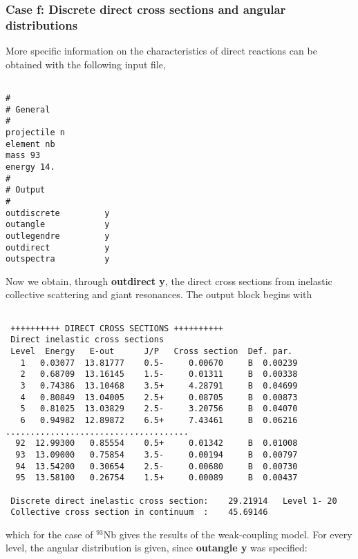\begin{samplecase}
\subsubsection{Case f: Discrete direct cross sections and angular 
distributions}
More specific information on the characteristics of direct reactions can be 
obtained with the following input file,

{\small \begin{verbatim}

#
# General
#
projectile n
element nb
mass 93
energy 14.
#
# Output
#
outdiscrete         y
outangle            y     
outlegendre         y     
outdirect           y
outspectra          y
\end{verbatim} } \renewcommand{\baselinestretch}{1.07}\small\normalsize
\noindent
Now we obtain, through {\bf outdirect y}, the direct cross sections from 
inelastic collective scattering and giant resonances. The output block
begins with

{\small \begin{verbatim}

 ++++++++++ DIRECT CROSS SECTIONS ++++++++++                                    
 Direct inelastic cross sections                                                
 Level  Energy   E-out      J/P   Cross section  Def. par.                      
   1   0.03077  13.81777    0.5-     0.00670     B  0.00239                     
   2   0.68709  13.16145    1.5-     0.01311     B  0.00338
   3   0.74386  13.10468    3.5+     4.28791     B  0.04699                     
   4   0.80849  13.04005    2.5+     0.08705     B  0.00873
   5   0.81025  13.03829    2.5-     3.20756     B  0.04070                     
   6   0.94982  12.89872    6.5+     7.43461     B  0.06216
.....................................
  92  12.99300   0.85554    0.5+     0.01342     B  0.01008
  93  13.09000   0.75854    3.5-     0.00194     B  0.00797
  94  13.54200   0.30654    2.5-     0.00680     B  0.00730
  95  13.58100   0.26754    1.5+     0.00089     B  0.00437
  
 Discrete direct inelastic cross section:    29.21914   Level 1- 20
 Collective cross section in continuum  :    45.69146
\end{verbatim} } \renewcommand{\baselinestretch}{1.07}\small\normalsize
\noindent
which for the case of ${}^{93}$Nb gives the results of the weak-coupling 
model. For every level, the angular distribution is given, since
{\bf outangle y} was specified:


\end{samplecase}
